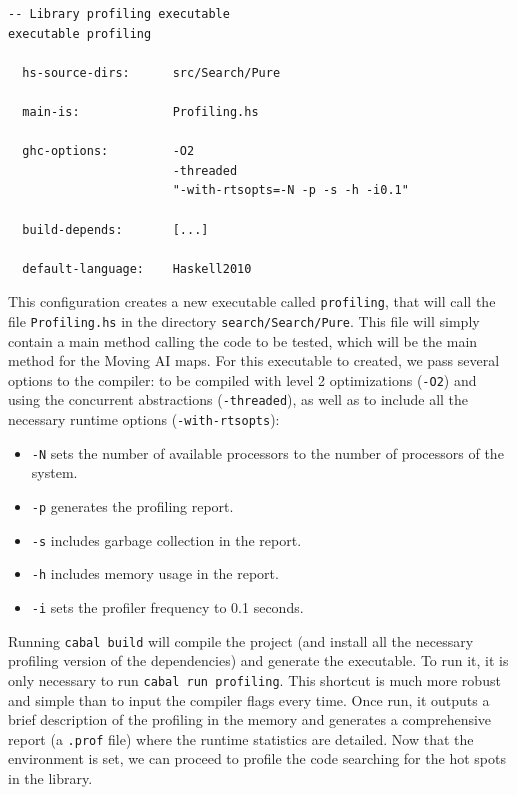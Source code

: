 \begin{lstlisting}[style=haskell, label=prof-cabal, caption=
Setup for the \texttt{profiling} executable in the Cabal file]
-- Library profiling executable
executable profiling

  hs-source-dirs:      src/Search/Pure
           
  main-is:             Profiling.hs
  
  ghc-options:         -O2
                       -threaded
                       "-with-rtsopts=-N -p -s -h -i0.1"

  build-depends:       [...]

  default-language:    Haskell2010
\end{lstlisting}

This configuration creates a new executable called \texttt{profiling}, that
will call the file \texttt{Profiling.hs} in the directory
\texttt{search/Search/Pure}. This file will simply contain a main method
calling the code to be tested, which will be the main method for the Moving AI
maps. For this executable to created, we pass several options to the compiler:
to be compiled with level 2 optimizations (\texttt{-O2}) and using the
concurrent abstractions (\texttt{-threaded}), as well as to include all the
necessary runtime options (\texttt{-with-rtsopts}):

\begin{itemize}
\item \texttt{-N} sets the number of available processors to the number of
  processors of the system.
\item \texttt{-p} generates the profiling report.
\item \texttt{-s} includes garbage collection in the report.
\item \texttt{-h} includes memory usage in the report.
\item \texttt{-i} sets the profiler frequency to 0.1 seconds.  
\end{itemize}

Running \texttt{cabal build} will compile the project (and install all the
necessary profiling version of the dependencies) and generate the executable.
To run it, it is only necessary to run \texttt{cabal run profiling}. This
shortcut is much more robust and simple than to input the compiler flags every
time. Once run, it outputs a brief description of the profiling in the memory
and generates a comprehensive report (a \texttt{.prof} file) where the runtime
statistics are detailed. Now that the environment is set, we can proceed to
profile the code searching for the hot spots in the library.


